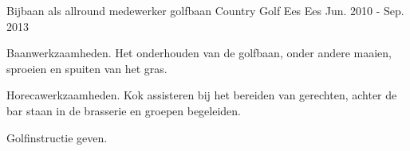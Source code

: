 \begin{cventries}
  \cventry
    {Bijbaan als allround medewerker golfbaan} %
    {Country Golf Ees} %
    {Ees} %
    {Jun. 2010 - Sep. 2013} %
    {
      \begin{cvitems} %
        \item {Baanwerkzaamheden. Het onderhouden van de golfbaan, onder andere maaien, sproeien en spuiten van het gras.}
        \item {Horecawerkzaamheden. Kok assisteren bij het bereiden van gerechten, achter de bar staan in de brasserie en groepen begeleiden. }
        \item {Golfinstructie geven.}
      \end{cvitems}
    }
    
\end{cventries}
